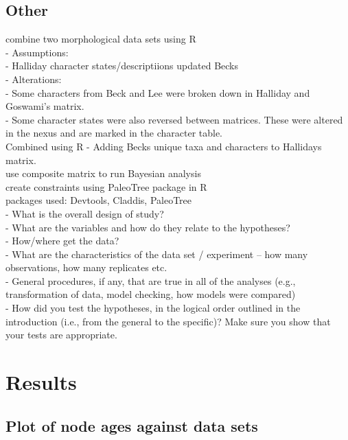 \documentclass[a4paper,11pt]{article}
\begin{document}
\subsection{Other}

combine two morphological data sets using R \\
- Assumptions: \\ 
- Halliday character states/descriptiions updated Becks\\ 

- Alterations:\\
- Some characters from Beck and Lee were broken down in Halliday and Goswami’s matrix. \\
- Some character states were also reversed between matrices. These were altered in the nexus and are marked in the character table. \\
 
Combined using R - Adding Becks unique taxa and characters to Hallidays matrix. \\ 

use composite matrix to run Bayesian analysis\\
create constraints using PaleoTree package in R\\
packages used: Devtools, Claddis, PaleoTree \\

- What is the overall design of study?\\
- What are the variables and how do they relate to the hypotheses?\\
- How/where get the data?\\
- What are the characteristics of the data set / experiment -- how many observations, how many replicates etc.\\
- General procedures, if any, that are true in all of the analyses (e.g., transformation of data, model checking, how models were compared)\\
- How did you test the hypotheses, in the logical order outlined in the introduction (i.e., from the general to the specific)? Make sure you show that your tests are appropriate.\\

\section{Results} 

\subsection{Plot of node ages against data sets}
\end{document}
